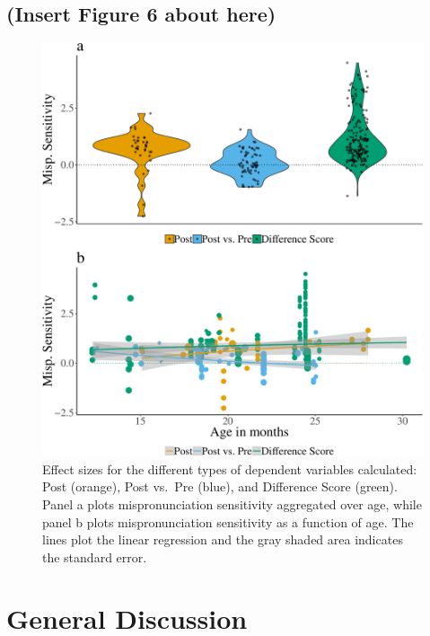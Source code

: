 \documentclass[man]{apa6}
\theoremstyle{definition}
\theoremstyle{definition}
\theoremstyle{definition}
\theoremstyle{remark}
\begin{document}
\subsection{(Insert Figure 6 about
here)}\label{insert-figure-6-about-here}

\begin{figure}
\centering
\includegraphics{Paper_Analyses_files/figure-latex/Plot-Within-cond-age-diff-score-1.pdf}
\caption{\label{fig:Plot-Within-cond-age-diff-score}Effect sizes for the
different types of dependent variables calculated: Post (orange), Post
vs.~Pre (blue), and Difference Score (green). Panel a plots
mispronunciation sensitivity aggregated over age, while panel b plots
mispronunciation sensitivity as a function of age. The lines plot the
linear regression and the gray shaded area indicates the standard
error.}
\end{figure}

\section{General Discussion}\label{general-discussion}
\end{document}
